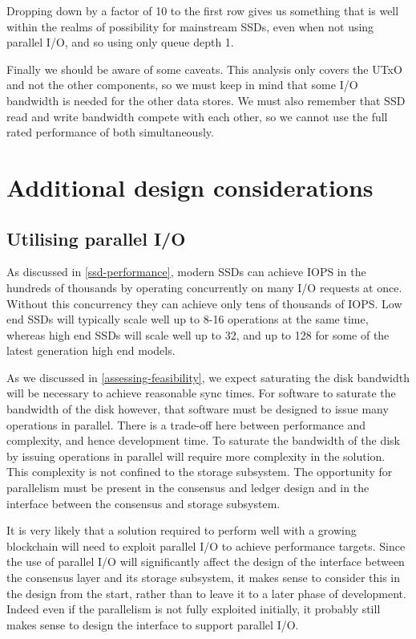 \documentclass[11pt,a4paper]{article}
\begin{document}
Dropping down by a factor of 10 to the first row gives us something that is
well within the realms of possibility for mainstream SSDs, even when not using
parallel I/O, and so using only queue depth 1.

Finally we should be aware of some caveats. This analysis only covers the UTxO
and not the other components, so we must keep in mind that some I/O bandwidth
is needed for the other data stores. We must also remember that SSD read and
write bandwidth compete with each other, so we cannot use the full rated
performance of both simultaneously.

\section{Additional design considerations}

\subsection{Utilising parallel I/O}
\label{parallel-io}

As discussed in \cref{ssd-performance}, modern SSDs can achieve IOPS in the
hundreds of thousands by operating concurrently on many I/O requests at once.
Without this concurrency they can achieve only tens of thousands of IOPS.
Low end SSDs will typically scale well up to 8-16 operations at the same time,
whereas high end SSDs will scale well up to 32, and up to 128 for some of the
latest generation high end models.

As we discussed in \cref{assessing-feasibility}, we expect saturating the disk
bandwidth will be necessary to achieve reasonable sync times. For software to
saturate the bandwidth of the disk however, that software must be designed to
issue many operations in parallel. There is a trade-off here between
performance and complexity, and hence development time. To saturate the
bandwidth of the disk by issuing operations in parallel will require more
complexity in the solution. This complexity is not confined to the storage
subsystem. The opportunity for parallelism must be present in the consensus and
ledger design and in the interface between the consensus and storage subsystem.

It is very likely that a solution required to perform well with a growing
blockchain will need to exploit parallel I/O to achieve performance targets.
Since the use of parallel I/O will significantly affect the design of the
interface between the consensus layer and its storage subsystem, it makes sense
to consider this in the design from the start, rather than to leave it to a
later phase of development. Indeed even if the parallelism is not fully
exploited initially, it probably still makes sense to design the interface to
support parallel I/O.
\end{document}
